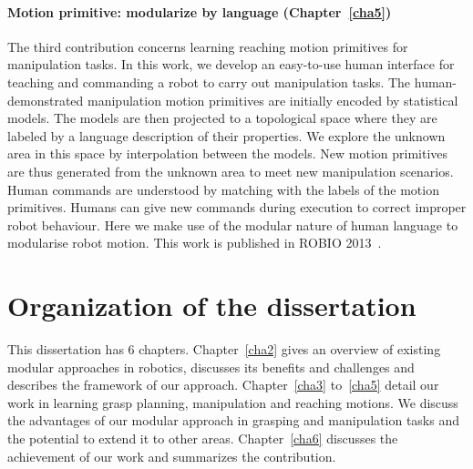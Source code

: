 \paragraph{Motion primitive: modularize by language (Chapter~\ref{cha5})}
The third contribution concerns learning reaching motion primitives for manipulation tasks. In this work, we develop an easy-to-use human interface for teaching and commanding a robot to carry out manipulation tasks. The human-demonstrated manipulation motion primitives are initially encoded by statistical models. The models are then projected to a topological space where they are labeled by a language description of their properties. We explore the unknown area in this space by interpolation between the models. New motion primitives are thus generated from the unknown area to meet new manipulation scenarios.
Human commands are understood by matching with the labels of the motion primitives. Humans can give new commands during execution to correct improper robot behaviour. Here we make use of the modular nature of human language to modularise robot motion. This work is published in ROBIO 2013~\citep{bidan2013robio}.






\section{Organization of the dissertation}
\label{cha1:organization}
This dissertation has 6 chapters. Chapter~\ref{cha2} gives an overview of existing modular approaches in robotics, discusses its benefits and challenges and describes the framework of our approach. Chapter~\ref{cha3} to~\ref{cha5} detail our work in learning grasp planning, manipulation and reaching motions. We discuss the advantages of our modular approach in grasping and manipulation tasks and the potential to extend it to other areas. Chapter~\ref{cha6} discusses the achievement of our work and summarizes the contribution.

